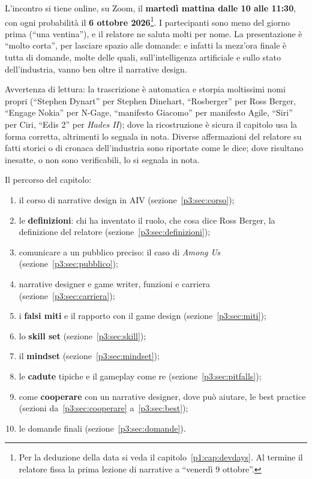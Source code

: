 L'incontro si tiene online, su Zoom, il \textbf{martedì mattina dalle 10
alle 11:30}, con ogni probabilità il \textbf{6 ottobre 2026}\footnote{Per la
deduzione della data si veda il capitolo~\ref{p1:cap:devdays}. Al termine il
relatore fissa la prima lezione di narrative a ``venerdì 9 ottobre''.}. I
partecipanti sono meno del giorno prima (``una ventina''), e il relatore ne
saluta molti per nome. La presentazione è ``molto corta'', per lasciare
spazio alle domande: e infatti la mezz'ora finale è tutta di domande, molte
delle quali, sull'intelligenza artificiale e sullo stato dell'industria,
vanno ben oltre il narrative design.

Avvertenza di lettura: la trascrizione è automatica e storpia moltissimi
nomi propri (``Stephen Dynart'' per Stephen Dinehart, ``Rosberger'' per Ross
Berger, ``Engage Nokia'' per N-Gage, ``manifesto Giacomo'' per manifesto
Agile, ``Siri'' per Ciri, ``Edis 2'' per \emph{Hades II}); dove la
ricostruzione è sicura il capitolo usa la forma corretta, altrimenti lo
segnala in nota. Diverse affermazioni del relatore su fatti storici o di
cronaca dell'industria sono riportate come le dice; dove risultano inesatte,
o non sono verificabili, lo si segnala in nota.

Il percorso del capitolo:
\begin{enumerate}
  \item il corso di narrative design in AIV (sezione~\ref{p3:sec:corso});
  \item le \textbf{definizioni}: chi ha inventato il ruolo, che cosa dice
        Ross Berger, la definizione del relatore
        (sezione~\ref{p3:sec:definizioni});
  \item comunicare a un pubblico preciso: il caso di \emph{Among Us}
        (sezione~\ref{p3:sec:pubblico});
  \item narrative designer e game writer, funzioni e carriera
        (sezione~\ref{p3:sec:carriera});
  \item i \textbf{falsi miti} e il rapporto con il game design
        (sezione~\ref{p3:sec:miti});
  \item lo \textbf{skill set} (sezione~\ref{p3:sec:skill});
  \item il \textbf{mindset} (sezione~\ref{p3:sec:mindset});
  \item le \textbf{cadute} tipiche e il gameplay come re
        (sezione~\ref{p3:sec:pitfalls});
  \item come \textbf{cooperare} con un narrative designer, dove può aiutare,
        le best practice (sezioni da~\ref{p3:sec:cooperare}
        a~\ref{p3:sec:best});
  \item le domande finali (sezione~\ref{p3:sec:domande}).
\end{enumerate}

